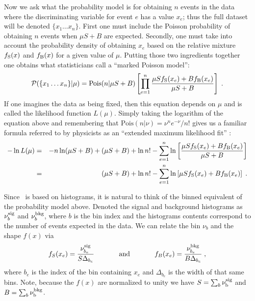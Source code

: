 Now we ask what the probability model is for obtaining $n$ events in the data where the discriminating variable for event $e$ has a value $x_e$; thus the full dataset will be denoted $\{x_1\dots x_n\}$.  First one must include the Poisson probability of obtaining $n$ events when $\mu S + B$ are expected.  Secondly, one must take into account the probability density of obtaining $x_e$ based on the  relative mixture $f_{\rm S}(x)$ and $f_{\rm B}(x)$ for a given value of $\mu$.   Putting those two ingredients together one obtains what statisticians call a ``marked Poisson model'':
\begin{eqnarray}
{\cal P}(\{x_1\dots x_n\} | \mu)=  \textrm{Pois}(n | \mu S+B) \left[ \prod_{e=1}^n \frac{\mu S f_{\rm S}(x_e) + B f_{\rm B}(x_e)}{\mu S+B}\right ] \; .
\end{eqnarray}
If one imagines the data as being fixed, then this equation depends on $\mu$ and is called the likelihood function $L(\mu)$.  Simply taking the logarithm of the equation above and remembering that $\textrm{Pois}(n|\nu) = \nu^n e^{-\nu} / n!$ gives us a familiar formula referred to by physicists as an ``extended maximum likelihood fit'' :
\begin{eqnarray}\nonumber
-\ln L( \mu) &=&  -n \ln(\mu S + B) 	+ (\mu S + B) + \ln n! - \sum_{e=1}^n \ln \left[ \frac{\mu S f_{\rm S}(x_e) + B f_{\rm B}(x_e)}{\mu S+B}\right] \\
&=& (\mu S + B) + \ln n!- \sum_{e=1}^n \ln \left[ \mu S f_{\rm S}(x_e) + B f_{\rm B}(x_e)\right]  \; .
\end{eqnarray}

Since \HF\ is based on histograms, it is natural to think of the binned equivalent of the probability model above.  Denoted the signal and background histograms as $\nu_b^{\rm sig}$ and $\nu_b^{\rm bkg}$, where $b$ is the bin index and the histograms contents correspond to the number of events expected in the data.   We can relate the bin $\nu_b$ and the shape $f(x)$ via
 \begin{equation}
 \label{eq:shape}
    f_S(x_e ) = \frac{\nu_{b_e}^{\rm sig}}{S \Delta_{b_e}}   \hspace{.5in}  \textrm{and}  \hspace{.5in}  f_B(x_e ) = \frac{\nu_{b_e}^{\rm bkg}}{B \Delta_{b_e}} \;,
\end{equation}
where $b_e$ is the index of the bin containing $x_e$ and $\Delta_{b_e}$ is the width of that same bins.  Note, because the $f(x)$ are normalized to unity we have $S=\sum_b  \nu_{\rm b}^{\rm sig}$ and $B=\sum_b  \nu_{\rm b}^{\rm bkg}$.


